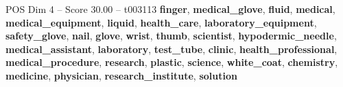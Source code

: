 \begin{textsample}{POS Dim 4 – Score 30.00 – t003113}  \label{ex:f4_pos_010}
\textbf{finger}, \textbf{medical\_glove}, \textbf{fluid}, \textbf{medical}, \textbf{medical\_equipment}, \textbf{liquid}, \textbf{health\_care}, \textbf{laboratory\_equipment}, \textbf{safety\_glove}, \textbf{nail}, \textbf{glove}, \textbf{wrist}, \textbf{thumb}, \textbf{scientist}, \textbf{hypodermic\_needle}, \textbf{medical\_assistant}, \textbf{laboratory}, \textbf{test\_tube}, \textbf{clinic}, \textbf{health\_professional}, \textbf{medical\_procedure}, \textbf{research}, \textbf{plastic}, \textbf{science}, \textbf{white\_coat}, \textbf{chemistry}, \textbf{medicine}, \textbf{physician}, \textbf{research\_institute}, \textbf{solution}

\end{textsample}
